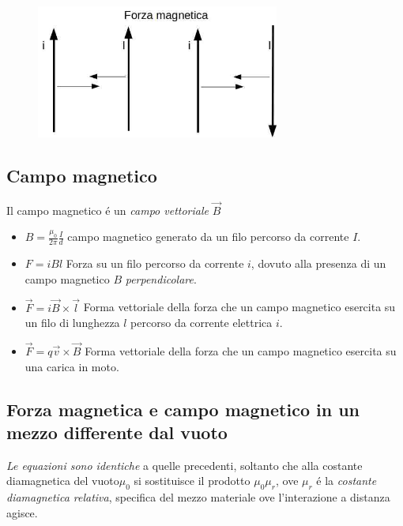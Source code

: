 \documentclass[17pt]{article}
\begin{document}
\begin{figure}[th]
\includegraphics[width=8cm]{forzaMagnetica.jpg}
\centering
\end{figure}


\subsection{Campo magnetico}
Il campo magnetico \'e un \emph{campo vettoriale} $\vec{B}$

\begin{itemize}
	\item $B = \frac{\mu_0}{2\pi} \frac{I}{d}$ campo magnetico generato da un filo percorso da corrente $I$.
	\item $F = iBl$ Forza su un filo percorso da corrente $i$, dovuto alla presenza di un campo magnetico $B$ \emph{perpendicolare}.
	\item $\vec{F} = i\vec{B}\times\vec{l}$ Forma vettoriale della forza che un campo magnetico esercita su un filo di lunghezza $l$ percorso da corrente elettrica $i$.
	\item $\vec{F} = q\vec{v}\times\vec{B}$ Forma vettoriale della forza che un campo magnetico esercita su una carica in moto.
\end{itemize}

\subsection{Forza magnetica e campo magnetico in un mezzo differente dal vuoto}

\emph{Le equazioni sono identiche} a quelle precedenti, soltanto che alla costante diamagnetica del vuoto$\mu_0$ si sostituisce il prodotto $\mu_0\mu_r$, ove $\mu_r$ \'e la \emph{costante diamagnetica relativa}, specifica del mezzo materiale ove l'interazione a distanza agisce.
\end{document}

